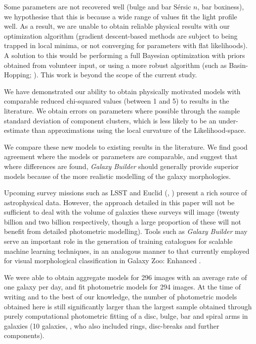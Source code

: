 \documentclass[trackchanges]{aastex63}
\begin{document}
Some parameters are not recovered well (bulge and bar S\'ersic $n$, bar boxiness), we hypothesise that this is because a wide range of values fit the light profile well. As a result, we are unable to obtain reliable physical results with our optimization algorithm (gradient descent-based methods are subject to being trapped in local minima, or not converging for parameters with flat likelihoods). A solution to this would be performing a full Bayesian optimization with priors obtained from volunteer input, or using a more robust algorithm (such as Basin-Hopping; \citealt{1998cond.mat..3344W}). This work is beyond the scope of the current study.

We have demonstrated our ability to obtain physically motivated models with comparable reduced chi-squared values (between 1 and 5) to results in the literature. We obtain errors on parameters where possible through the sample standard deviation of component clusters, which is less likely to be an under-estimate than approximations using the local curvature of the Likelihood-space.

We compare these new models to existing results in the literature. We find good agreement where the models or parameters are comparable, and suggest that where differences are found, \textit{Galaxy Builder} should generally provide superior models because of the more realistic modelling of the galaxy morphologies.

Upcoming survey missions such as LSST \citep{2019ApJ...873..111I} and Euclid (\citealt{2011arXiv1110.3193L}, \citealt{2012SPIE.8442E..0ZA}) present a rich source of astrophysical data. However, the approach detailed in this paper will not be sufficient to deal with the volume of galaxies these surveys will image (twenty billion and two billion respectively, though a large proportion of these will not benefit from detailed photometric modelling). Tools such as \textit{Galaxy Builder} may serve an important role in the generation of training catalogues for scalable machine learning techniques, in an analogous manner to that currently employed for visual morphological classification in Galaxy Zoo: Enhanced \citep{2020MNRAS.491.1554W}.

We were able to obtain aggregate models for 296 images with an average rate of one galaxy per day, and fit photometric models for 294 images. At the time of writing and to the best of our knowledge, the number of photometric models obtained here is still significantly larger than the largest sample obtained through purely computational photometric fitting of a disc, bulge, bar and spiral arms in galaxies (10 galaxies, \citealt{Gao2017:1709.00746v1}, who also included rings, disc-breaks and further components).
\end{document}
